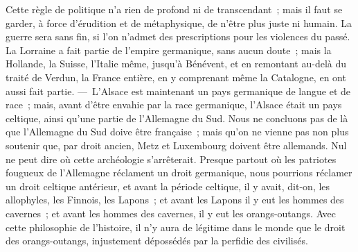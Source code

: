\documentclass[french,twoside]{book} %
\begin{document}
Cette règle de politique n’a rien de profond ni de transcendant ; mais il faut se garder, à force d’érudition et de métaphysique, de n’être plus juste ni humain. La guerre sera sans fin, si l’on n’admet des prescriptions pour les violences du passé. La Lorraine a fait partie de l’empire germanique, sans aucun doute ; mais la Hollande, la Suisse, l’Italie même, jusqu’à Bénévent, et en remontant au-delà du traité de Verdun, la France entière, en y comprenant même la Catalogne, en ont aussi fait partie. — L’Alsace est maintenant un pays germanique de langue et de race ; mais, avant d’être envahie par la race germanique, l’Alsace était un pays celtique, ainsi qu’une partie de l’Allemagne du Sud. Nous ne concluons pas de là que l’Allemagne du Sud doive être française ; mais qu’on ne vienne pas non plus soutenir que, par droit ancien, Metz et Luxembourg doivent être allemands. Nul ne peut dire où cette archéologie s’arrêterait. Presque partout où les patriotes fougueux de l’Allemagne réclament un droit germanique, nous pourrions réclamer un droit celtique antérieur, et avant la période celtique, il y avait, dit-on, les allophyles, les Finnois, les Lapons ; et avant les Lapons il y eut les hommes des cavernes ; et avant les hommes des cavernes, il y eut les orangs-outangs. Avec cette philosophie de l’histoire, il n’y aura de légitime dans le monde que le droit des orangs-outangs, injustement dépossédés par la perfidie des civilisés.\par
\end{document}
